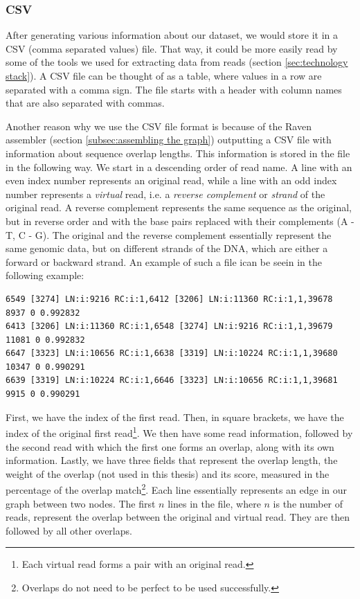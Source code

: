 \documentclass[times, utf8, diplomski, english]{fer_eng}
\begin{document}
\subsubsection{CSV}
\label{subsubsec:csv}

After generating various information about our dataset, we would store it in a CSV (comma separated values) file. That way, it could be  more easily read by some of the tools we used for extracting data from reads (section \ref{sec:technology stack}). A CSV file can be thought of as a table, where values in a row are separated with a comma sign. The file starts with a header with column names that are also separated with commas.

Another reason why we use the CSV file format is because of the Raven assembler (section \ref{subsec:assembling the graph}) outputting a CSV file with information about sequence overlap lengths. This information is stored in the file in the following way. We start in a descending order of read name. A line with an even index number represents an original read, while a line with an odd index number represents a \textit{virtual} read, i.e. a \textit{reverse complement} or \textit{strand} of the original read. A reverse complement represents the same sequence as the original, but in reverse order and with the base pairs replaced with their complements (A - T, C - G). The original and the reverse complement essentially represent the same genomic data, but on different strands of the DNA, which are either a forward or backward strand. An example of such a file ican be seein in the following example:
\begin{lstlisting}
6549 [3274] LN:i:9216 RC:i:1,6412 [3206] LN:i:11360 RC:i:1,1,39678 8937 0 0.992832
6413 [3206] LN:i:11360 RC:i:1,6548 [3274] LN:i:9216 RC:i:1,1,39679 11081 0 0.992832
6647 [3323] LN:i:10656 RC:i:1,6638 [3319] LN:i:10224 RC:i:1,1,39680 10347 0 0.990291
6639 [3319] LN:i:10224 RC:i:1,6646 [3323] LN:i:10656 RC:i:1,1,39681 9915 0 0.990291
\end{lstlisting}
First, we have the index of the first read. Then, in square brackets, we have the index of the original first read\footnote{Each virtual read forms a pair with an original read.}. We then have some read information, followed by the second read with which the first one forms an overlap, along with its own information. Lastly, we have three fields that represent the overlap length, the weight of the overlap (not used in this thesis) and its score, measured in the percentage of the overlap match\footnote{Overlaps do not need to be perfect to be used successfully.}. Each line essentially represents an edge in our graph between two nodes. The first $n$ lines in the file, where $n$ is the number of reads, represent the overlap between the original and virtual read. They are then followed by all other overlaps.
\end{document}
